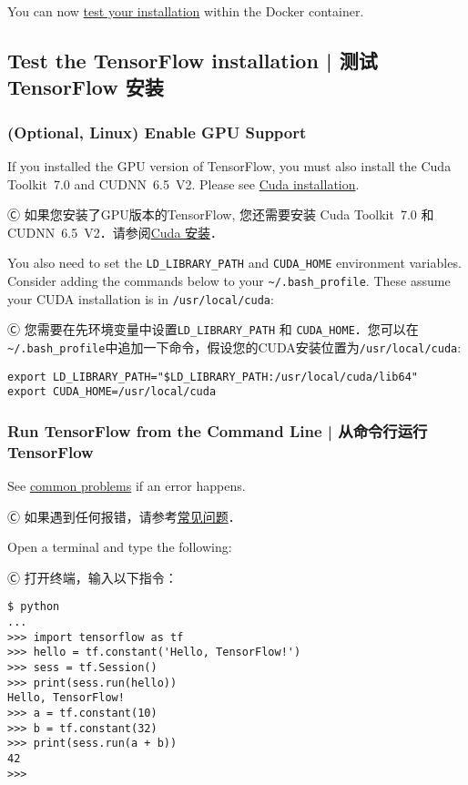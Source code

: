 You can now \hyperref[test_install]{test your installation} within the Docker container.


%
\subsection {Test the TensorFlow installation  |  测试 TensorFlow 安装} \label{test_install}

\subsubsection {(Optional, Linux) Enable GPU Support}

\textcolor{etc}{If you installed the GPU version of TensorFlow, you must also install the Cuda Toolkit~7.0 and CUDNN~6.5~V2. Please see \hyperref[install_cuda]{Cuda installation}.}

Ⓒ 如果您安装了GPU版本的TensorFlow, 您还需要安装 Cuda Toolkit~7.0 和 CUDNN~6.5~V2．请参阅\hyperref[install_cuda]{Cuda 安装}．

\textcolor{etc}{You also need to set the \lstinline{LD_LIBRARY_PATH} and \lstinline{CUDA_HOME} environment variables. Consider adding the commands below to your} \lstinline{~/.bash_profile}. \textcolor{etc}{These assume your CUDA installation is in \lstinline{/usr/local/cuda}:}

Ⓒ 您需要在先环境变量中设置\lstinline{LD_LIBRARY_PATH} 和 \lstinline{CUDA_HOME}．您可以在\lstinline{~/.bash_profile}中追加一下命令，假设您的CUDA安装位置为\lstinline{/usr/local/cuda}:

\begin{lstlisting}
export LD_LIBRARY_PATH="$LD_LIBRARY_PATH:/usr/local/cuda/lib64"
export CUDA_HOME=/usr/local/cuda
\end{lstlisting}

\subsubsection {Run TensorFlow from the Command Line  |  从命令行运行TensorFlow}

See \hyperref[comm_prob]{common problems} if an error happens.

Ⓒ 如果遇到任何报错，请参考\hyperref[comm_prob]{常见问题}．

Open a terminal and type the following:

Ⓒ 打开终端，输入以下指令：

\begin{lstlisting}
$ python
...
>>> import tensorflow as tf
>>> hello = tf.constant('Hello, TensorFlow!')
>>> sess = tf.Session()
>>> print(sess.run(hello))
Hello, TensorFlow!
>>> a = tf.constant(10)
>>> b = tf.constant(32)
>>> print(sess.run(a + b))
42
>>>
\end{lstlisting}

